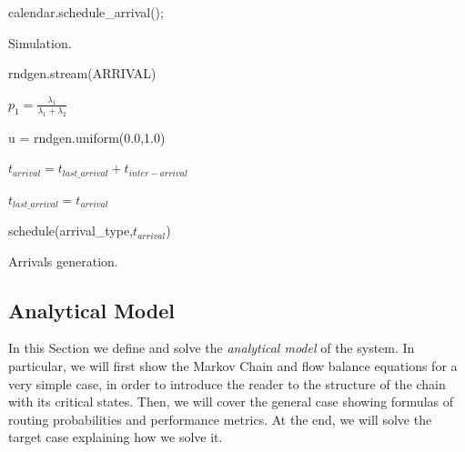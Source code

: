 \begin{algorithm}
	\SetAlgoLined
	
	calendar.schedule\_arrival();
	
\caption{Simulation.}
\label{alg:simulation}
\end{algorithm}

\begin{algorithm}
	\SetAlgoLined
	
	rndgen.stream(ARRIVAL)
	
	$p_{1}=\frac{\lambda_{1}}{\lambda_{1}+\lambda_{2}}$
	
	u = rndgen.uniform(0.0,1.0)
	
	
	$t_{arrival}=t_{last\_arrival}+t_{inter-arrival}$

	$t_{last\_arrival}=t_{arrival}$
	
	schedule(arrival\_type,$t_{arrival}$)
	
	\caption{Arrivals generation.}
	\label{alg:arrivals}
\end{algorithm}

\subsection{Analytical Model}
In this Section we define and solve the \textit{analytical model} of the system.
%
In particular, we will first show the Markov Chain and flow balance equations for a very simple case, in order to introduce the reader to the structure of the chain with its critical states.
%
Then, we will cover the general case showing formulas of routing probabilities and performance metrics.
%
At the end, we will solve the target case explaining how we solve it.

